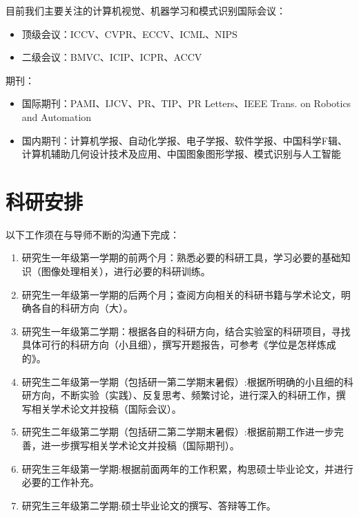 \documentclass[a4paper，12pt]{article}
\begin{document}
目前我们主要关注的计算机视觉、机器学习和模式识别国际会议：

\begin{itemize}

\item 顶级会议：ICCV、CVPR、ECCV、ICML、NIPS

\item 二级会议：BMVC、ICIP、ICPR、ACCV

\end{itemize}

期刊：

\begin{itemize}

\item 国际期刊：PAMI、IJCV、PR、TIP、PR Letters、IEEE Trans. on Robotics and Automation

\item 国内期刊：计算机学报、自动化学报、电子学报、软件学报、中国科学F辑、计算机辅助几何设计技术及应用、中国图象图形学报、模式识别与人工智能
\end{itemize}

\section{科研安排}

以下工作须在与导师不断的沟通下完成：

\begin{enumerate}

\item 研究生一年级第一学期的前两个月：熟悉必要的科研工具，学习必要的基础知识（图像处理相关），进行必要的科研训练。

\item 研究生一年级第一学期的后两个月；查阅方向相关的科研书籍与学术论文，明确各自的科研方向（大）。

\item 研究生一年级第二学期：根据各自的科研方向，结合实验室的科研项目，寻找具体可行的科研方向（小且细），撰写开题报告，可参考《学位是怎样炼成的》。

\item 研究生二年级第一学期（包括研一第二学期末暑假）:根据所明确的小且细的科研方向，不断实验（实践）、反复思考、频繁讨论，进行深入的科研工作，撰写相关学术论文并投稿（国际会议）。

\item 研究生二年级第二学期（包括研二第二学期末暑假）:根据前期工作进一步完善，进一步撰写相关学术论文并投稿（国际期刊）。

\item 研究生三年级第一学期:根据前面两年的工作积累，构思硕士毕业论文，并进行必要的工作补充。

\item 研究生三年级第二学期:硕士毕业论文的撰写、答辩等工作。

\end{enumerate}
\end{document}
